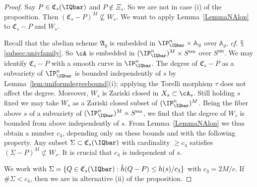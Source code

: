 \begin{proof}
Say $P\in \mathfrak{C}_s(\IQbar)$ and $P\not\in \Xi_s$.
So we are not in case (i) of the proposition.
Then $(\mathfrak{C}_s-P)^M
\not\subseteq W_s$. We want to apply Lemma~\ref{LemmaNAlon} to
$\mathfrak{C}_s-P$ and $W_s$.

Recall that the abelian scheme $\mathfrak{A}_{g}$ is embedded in
$\IP_{\IQbar}^n\times \mathbb{A}_g$  over
$\mathbb{A}_g$, \textit{cf.}
$\mathsection$\ref{subsec:univfamily}.
So $\cA$ is embedded in $(\IP_{\IQbar}^n)^M\times S^{\mathrm{sm}}$ over $S^{\mathrm{sm}}$.
We may identify $\mathfrak{C}_s-P$ with
 a smooth curve in $\IP_{\IQbar}^n$.
The degree of $\mathfrak{C}_s-P$ as a subvariety of $\IP_\IQbar^n$
is bounded independently of $s$ by
Lemma~\ref{lem:uniformdegreebound}(i); applying the Torelli
morphism $\tau$ does not affect the degree.
Moreover, $W_s$ is Zariski closed in
$X_s\subset \cA_{s}$. Still holding $s$ fixed we may take $W_s$ as a Zariski
closed subset of $(\IP_{\IQbar}^n)^M$. Being the fiber above $s$ of a
subvariety of $(\IP_{\IQbar}^n)^M\times S^{\mathrm{sm}}$, we find that the degree
of $W_s$ is bounded from above independently of $s$.
From
Lemma~\ref{LemmaNAlon} we
thus obtain a number $c_4$, depending only  on these bounds and with the
following property. Any subset $\Sigma \subset
\mathfrak{C}_s(\IQbar)$ with cardinality $\ge c_4$ satisfies $(\Sigma-P)^M
\not\subset W_s$.
It is crucial that $c_4$ is independent of $s$.

We work with $\Sigma = \{Q \in \mathfrak{C}_s(\IQbar) : \hat{h}(Q-P)
\le  h(s)/c_3 \}$ with $c_3 = 2M/c$.
If $\#\Sigma < c_4$, then we are in alternative (ii) of the proposition.


\end{proof}
